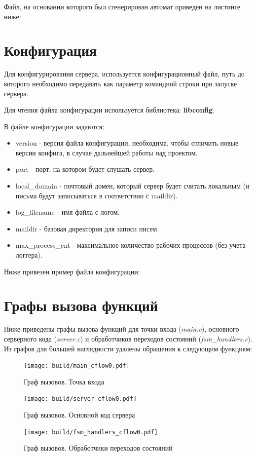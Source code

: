\documentclass[a4paper,12pt]{report}
\begin{document}
Файл, на основании которого был сгенерирован автомат приведен на листинге ниже:


\section{Конфигурация}
Для конфигурирования сервера, используется конфигурационный файл, путь до которого необходимо передавать как параметр командной строки при запуске сервера. 

Для чтения файла конфигурации используется библиотека: \textbf{libconfig}.

В файле конфигурации задаются: 
\begin{itemize}
	\item version - версия файла конфигурации, необходима, чтобы отличить новые версии конфига, в случае дальнейшей работы над проектом.  
	\item port - порт, на котором будет слушать сервер.  
	\item local\_domain - почтовый домен, который сервер будет считать локальным (и письма будут записываться в соответствии с maildir).
	\item log\_filename - имя файла с логом. 
	\item maildir - базовая директория для записи писем.
	\item max\_process\_cnt - максимальное количество рабочих процессов (без учета логгера). 
\end{itemize}


Ниже привезен пример файла конфигурации:


\section{Графы вызова функций}
Ниже приведены графы вызова функций для точки входа (\textit{main.c}), основного серверного кода (\textit{server.c}) и обработчиков переходов состояний (\textit{fsm\_handlers.c}). Из графов для большей наглядности удалены обращения к следующим функциям: 



\begin{figure}[H]
	\texttt{[image: build/main\_cflow0.pdf]}
	\caption{Граф вызовов. Точка входа}
	\label{fig:cflow1}
\end{figure}

\begin{figure}[H]
	\texttt{[image: build/server\_cflow0.pdf]}
	\caption{Граф вызовов. Основной код сервера}
	\label{fig:cflow2}
\end{figure}
\begin{figure}[H]
	\texttt{[image: build/fsm\_handlers\_cflow0.pdf]}
	\caption{Граф вызовов. Обработчики переходов состояний}
	\label{fig:cflow3}
\end{figure}
\end{document}
